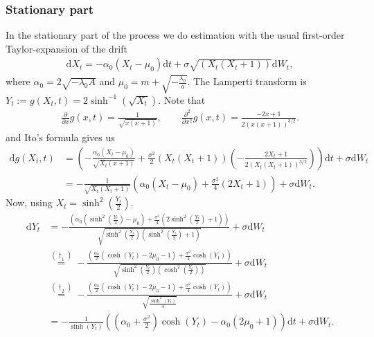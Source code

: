 \subsubsection{Stationary part}
In the stationary part of the process we do estimation with the usual first-order Taylor-expansion of the drift
\begin{align}
    \mathrm{d}X_t = -\alpha_0\left(X_t - \mu_0\right)\mathrm{d}t + \sigma \sqrt{\left(X_t\left(X_t + 1\right)\right)}\mathrm{d}W_t,
\end{align}
where $\alpha_0 = 2\sqrt{-\lambda_0 A}$ and $\mu_0 = m + \sqrt{-\frac{\lambda_0}{a}}$.
The Lamperti transform is $Y_t := g(X_t, t) = 2 \sinh^{-1}\left(\sqrt{X_t}\right)$. Note that
\begin{align}
    \frac{\partial}{\partial x}g(x, t) = \frac{1}{\sqrt{x\left(x + 1\right)}}, \qquad \frac{\partial^2}{\partial x^2}g(x, t) = \frac{-2x + 1}{2\left(x\left(x + 1\right)\right)^{3/2}}.
\end{align}
and Ito's formula gives us
\begin{align}
    \mathrm{d}g(X_t, t) &= \left(-\frac{\alpha_0\left(X_t - \mu_0\right)}{\sqrt{X_t\left(x + 1\right)}} + \frac{\sigma^2}{2}\left(X_t\left(X_t + 1\right)\right)\left(-\frac{2X_t + 1}{2\left(X_t\left(X_t + 1\right)\right)^{3/2}}\right)\right)\mathrm{d}t + \sigma\mathrm{d}W_t \nonumber\\
    &= -\frac{1}{\sqrt{X_t\left(X_t + 1\right)}}\left(\alpha_0\left(X_t - \mu_0\right) + \frac{\sigma^2}{4}\left(2X_t + 1\right)\right) + \sigma\mathrm{d}W_t.
\end{align}
Now, using $X_t = \sinh^2\left(\frac{Y_t}{2}\right)$.
\begin{align}
    \mathrm{d}Y_t &=  -\frac{\left(\alpha_0\left(\sinh^2\left(\frac{Y_t}{2}\right) - \mu_0\right) + \frac{\sigma^2}{4}\left(2\sinh^2\left(\frac{Y_t}{2}\right) + 1\right)\right)}{\sqrt{\sinh^2\left(\frac{Y_t}{2}\right)\left(\sinh^2\left(\frac{Y_t}{2}\right) + 1\right)}} + \sigma\mathrm{d}W_t \nonumber \\
     &\overset{\left(\dagger_1\right)}{=} -\frac{\left(\frac{\alpha_0}{2}\left(\cosh(Y_t) - 2\mu_0 - 1\right)+\frac{\sigma^2}{4}\cosh(Y_t)\right)}{\sqrt{\sinh^2\left(\frac{Y_t}{2}\right)\left(\cosh^2\left(\frac{Y_t}{2}\right)\right)}} + \sigma\mathrm{d}W_t \nonumber \\
     &\overset{(\dagger_2)}{=} -\frac{\left(\frac{\alpha_0}{2}\left(\cosh(Y_t) - 2\mu_0 - 1\right)+\frac{\sigma^2}{4}\cosh(Y_t)\right)}{\sqrt{\frac{\sinh^2(Y_t)}{4}}} + \sigma\mathrm{d}W_t \nonumber \\
     &= - \frac{1}{\sinh(Y_t)}\left(\left(\alpha_0 + \frac{\sigma^2}{2}\right)\cosh(Y_t) - \alpha_0\left(2\mu_0 + 1\right)\right) \mathrm{d}t + \sigma \mathrm{d}W_t. \label{eq:F_diffusion_lamperti_SDE}
\end{align}

